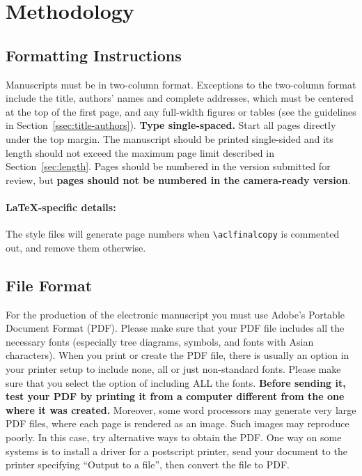 \section{Methodology}
\label{sec:methodology}
 
 
 
\subsection{Formatting Instructions}
 
 Manuscripts must be in two-column format.
 Exceptions to the two-column format include the title, authors' names and complete addresses, which must be centered at the top of the first page, and any full-width figures or tables (see the guidelines in Section~\ref{ssec:title-authors}).
 \textbf{Type single-spaced.}
 Start all pages directly under the top margin.
 The manuscript should be printed single-sided and its length should not exceed the maximum page limit described in Section~\ref{sec:length}.
 Pages should be numbered in the version submitted for review, but \textbf{pages should not be numbered in the camera-ready version}.
 
 \paragraph{\LaTeX-specific details:}
 The style files will generate page numbers when {\small\verb|\aclfinalcopy|} is commented out, and remove them otherwise.
 
 
 \subsection{File Format}
 \label{sect:pdf}
 
 For the production of the electronic manuscript you must use Adobe's Portable Document Format (PDF).
 Please make sure that your PDF file includes all the necessary fonts (especially tree diagrams, symbols, and fonts with Asian characters).
 When you print or create the PDF file, there is usually an option in your printer setup to include none, all or just non-standard fonts.
 Please make sure that you select the option of including ALL the fonts.
 \textbf{Before sending it, test your PDF by printing it from a computer different from the one where it was created.}
 Moreover, some word processors may generate very large PDF files, where each page is rendered as an image.
 Such images may reproduce poorly.
 In this case, try alternative ways to obtain the PDF.
 One way on some systems is to install a driver for a postscript printer, send your document to the printer specifying ``Output to a file'', then convert the file to PDF.
 
